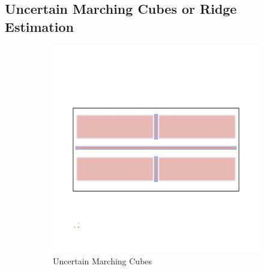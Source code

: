 \subsection{Uncertain Marching Cubes or Ridge Estimation}\label{sec:evalMeth}

\begin{figure}
    \begin{subfigure}{0.49\textwidth}
        \includegraphics[trim=0 450 0 450, clip=true, width=\textwidth]{Images/oldSide.png}
        \caption{Uncertain Marching Cubes}
        \label{fig:UMCside}
    \end{subfigure}
    \begin{subfigure}{0.49\textwidth}

\end{subfigure}
\end{figure}
